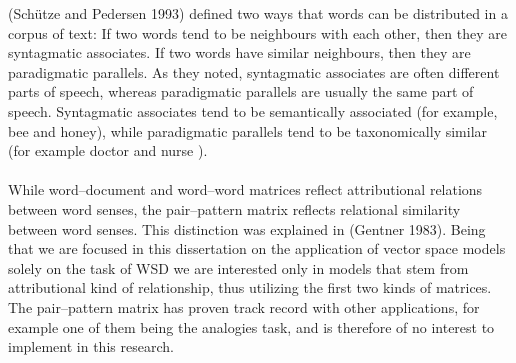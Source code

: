 (Sch\"utze and Pedersen 1993) defined two ways that words can be 
distributed in a corpus of text: If two words tend to be neighbours with each other, then they are 
syntagmatic associates. If two words have similar neighbours, then they are paradigmatic parallels. As 
they noted, syntagmatic associates are often different parts of speech, whereas paradigmatic parallels 
are usually the same part of speech. Syntagmatic associates tend to be semantically associated (for 
example, bee and honey), while paradigmatic parallels tend to be taxonomically similar (for example 
doctor and nurse ).
\\\\  While word--document and word--word matrices reflect attributional relations between word 
senses, the pair--pattern matrix reflects relational similarity between word senses. This distinction was 
explained in (Gentner 1983). Being that we are focused in this dissertation on the 
application of vector space models solely on the task of WSD we are interested only in models that stem 
from attributional kind of relationship, thus utilizing the first two kinds of matrices. The pair--pattern 
matrix has proven track record with other applications, for example one of them being the analogies 
task, and is therefore of no interest to implement in this research.